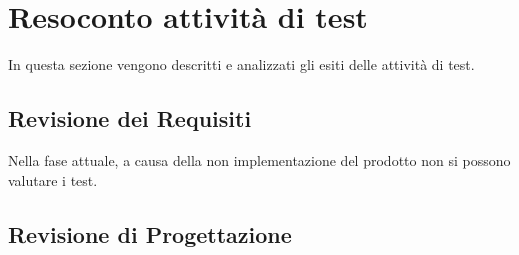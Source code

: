 \section{Resoconto attività di test}
In questa sezione vengono descritti e analizzati gli esiti delle attività
di test.

\subsection{Revisione dei Requisiti}

Nella fase attuale, a causa della non implementazione del prodotto non si possono valutare i test.


\subsection{Revisione di Progettazione}